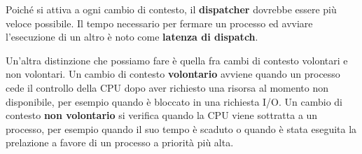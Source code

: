         Poiché si attiva a ogni cambio di contesto, il \textbf{dispatcher} dovrebbe essere più veloce possibile. Il tempo necessario per fermare un processo ed avviare l'esecuzione di un altro è noto come \textbf{latenza di dispatch}.
        
        Un'altra distinzione che possiamo fare è quella fra cambi di contesto volontari e non volontari. Un cambio di contesto \textbf{volontario} avviene quando un processo cede il controllo della CPU dopo aver richiesto una risorsa al momento non disponibile, per esempio quando è bloccato in una richiesta I/O. Un cambio di contesto \textbf{non volontario} si verifica quando la CPU viene sottratta a un processo, per esempio quando il suo tempo è scaduto o quando è stata eseguita la prelazione a favore di un processo a priorità più alta.
        
